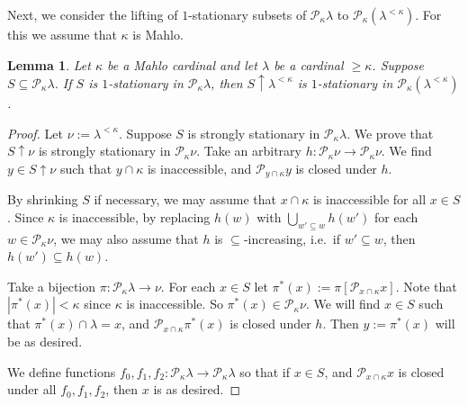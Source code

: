 \documentclass[a4paper,12pt,reqno,oneside]{amsart}
\theoremstyle{plain}
\newtheorem{lemma}[theorem]{Lemma}
\newcommand{\mcal}{\mathcal}
\begin{document}
Next, we consider the lifting of $1$-stationary subsets of $\mcal{P}_\kappa \lambda$ to $\mcal{P}_\kappa ( \lambda^{< \kappa} )$. For this we assume that $\kappa$ is Mahlo.


\begin{lemma} \label{lift_lambda_lambda<kappa}
Let $\kappa$ be a Mahlo cardinal and let $\lambda$ be a cardinal $\geq \kappa$. Suppose $S \subseteq \mcal{P}_\kappa \lambda$. If $S$ is $1$-stationary in $\mcal{P}_\kappa \lambda$, then $S \uparrow \lambda^{< \kappa}$ is $1$-stationary in $\mcal{P}_\kappa ( \lambda^{< \kappa} )$.
\end{lemma}


\begin{proof}
Let $\nu := \lambda^{< \kappa}$. Suppose $S$ is strongly stationary in $\mcal{P}_\kappa \lambda$. We prove that $S \uparrow \nu$ is strongly stationary in $\mcal{P}_\kappa \nu$. Take an arbitrary $h : \mcal{P}_\kappa \nu \to \mcal{P}_\kappa \nu$. We find $y \in S \uparrow \nu$ such that $y \cap \kappa$ is inaccessible, and $\mcal{P}_{y \cap \kappa} y$ is closed under $h$.

By shrinking $S$ if necessary, we may assume that $x \cap \kappa$ is inaccessible for all $x \in S$. Since $\kappa$ is inaccessible, by replacing $h(w)$ with $\bigcup_{w' \subseteq w} h(w')$ for each $w \in \mcal{P}_\kappa \nu$, we may also assume that $h$ is $\subseteq$-increasing, i.e.~if $w' \subseteq w$, then $h(w') \subseteq h(w)$.

Take a bijection $\pi : \mcal{P}_\kappa \lambda \to \nu$. For each $x \in S$ let $\pi^* (x) := \pi [ \mcal{P}_{x \cap \kappa} x ]$. Note that $| \pi^* (x) | < \kappa$ since $\kappa$ is inaccessible. So $\pi^* (x) \in \mcal{P}_\kappa \nu$. We will find $x \in S$ such that $\pi^* (x) \cap \lambda = x$, and $\mcal{P}_{x \cap \kappa} \pi^* (x)$ is closed under $h$. Then $y := \pi^* (x)$ will be as desired.

We define functions $f_0 , f_1 , f_2 : \mcal{P}_\kappa \lambda \to \mcal{P}_\kappa \lambda$ so that if $x \in S$, and $\mcal{P}_{x \cap \kappa} x$ is closed under all $f_0 , f_1 , f_2$, then $x$ is as desired.


\end{proof}
\end{document}
